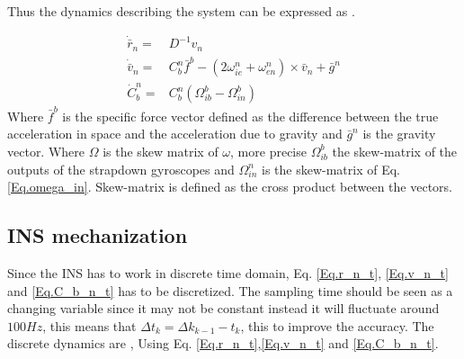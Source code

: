 \noindent Thus the dynamics describing the system can be expressed as \cite{nonlinear}.

\begin{align}
\dot{\bar{r}}_n = & D^{-1}v_n
\label{Eq.r_n_t}\\
\dot{\bar{v}}_n = & C_b^n \bar{f}^b-(2\omega_{ie}^n+\omega_{en}^n) \times \bar{v}_n +\bar{g}^n
\label{Eq.v_n_t}\\
\dot{C}_b^n = & C_b^n(\Omega_{ib}^b - \Omega_{in}^b)
\label{Eq.C_b_n_t}
\end{align}
Where $\bar{f}^b$ is the specific force vector defined as the difference between the true acceleration in
space and the acceleration due to gravity and $\bar{g}^n$ is the gravity vector. Where $\Omega$ is the skew matrix of $\omega$, more precise $\Omega_{ib}^b$ the skew-matrix of the outputs of the strapdown gyroscopes and $\Omega_{in}^n$ is the skew-matrix of Eq. \eqref{Eq.omega_in}. Skew-matrix is defined as the cross product between the vectors.


\subsection{INS mechanization}
Since the INS has to work in discrete time domain, Eq. \eqref{Eq.r_n_t}, \eqref{Eq.v_n_t} and \eqref{Eq.C_b_n_t} has to be discretized. The sampling time should be seen as a changing variable since it may not be constant instead it will fluctuate around $100Hz$, this means that $\Delta t_k = \Delta k_{k-1} - t_{k}$, this to improve the accuracy. The discrete dynamics are \cite{non-linear}, Using Eq. \eqref{Eq.r_n_t},\eqref{Eq.v_n_t} and \eqref{Eq.C_b_n_t}.


